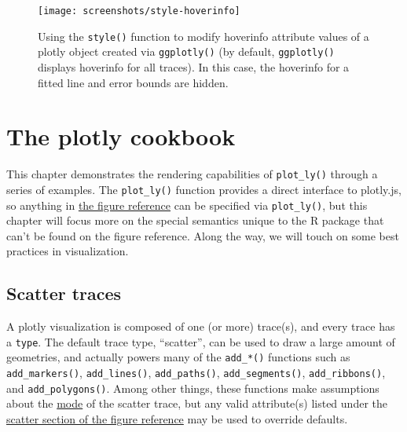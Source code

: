 \documentclass[12pt,]{isuthesis}
\begin{document}
\begin{figure}
\centering
\texttt{[image: screenshots/style-hoverinfo]}
\caption{\label{fig:style-hoverinfo}Using the \texttt{style()} function to
modify hoverinfo attribute values of a plotly object created via
\texttt{ggplotly()} (by default, \texttt{ggplotly()} displays hoverinfo
for all traces). In this case, the hoverinfo for a fitted line and error
bounds are hidden.}
\end{figure}

\section{The plotly cookbook}\label{the-plotly-cookbook}

This chapter demonstrates the rendering capabilities of
\texttt{plot\_ly()} through a series of examples. The
\texttt{plot\_ly()} function provides a direct interface to plotly.js,
so anything in \href{https://plot.ly/r/reference/}{the figure reference}
can be specified via \texttt{plot\_ly()}, but this chapter will focus
more on the special semantics unique to the R package that can't be
found on the figure reference. Along the way, we will touch on some best
practices in visualization.

\hypertarget{scatter-traces}{\subsection{Scatter
traces}\label{scatter-traces}}

A plotly visualization is composed of one (or more) trace(s), and every
trace has a \texttt{type}. The default trace type, ``scatter'', can be
used to draw a large amount of geometries, and actually powers many of
the \texttt{add\_*()} functions such as \texttt{add\_markers()},
\texttt{add\_lines()}, \texttt{add\_paths()}, \texttt{add\_segments()},
\texttt{add\_ribbons()}, and \texttt{add\_polygons()}. Among other
things, these functions make assumptions about the
\href{https://plot.ly/r/reference/\#scatter-mode}{mode} of the scatter
trace, but any valid attribute(s) listed under the
\href{https://plot.ly/r/reference/\#scatter}{scatter section of the
figure reference} may be used to override defaults.
\end{document}
